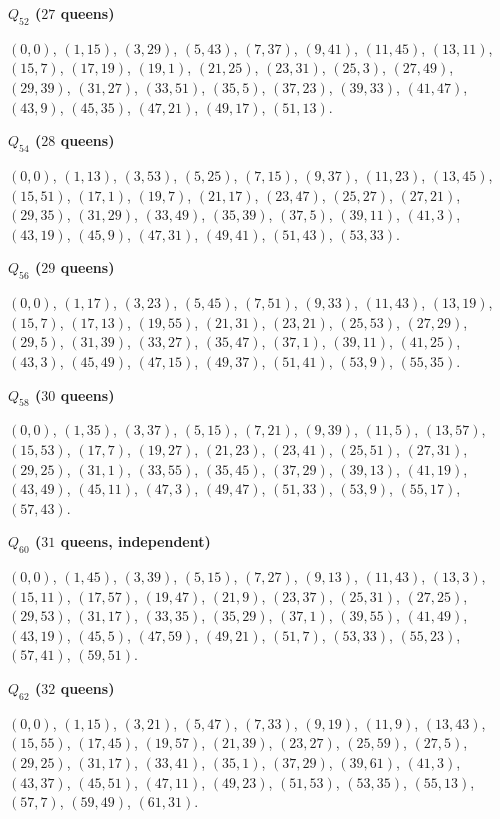 \documentclass[11pt,a4paper]{article}
\theoremstyle{result}
\theoremstyle{definition}
\theoremstyle{remark}
\newenvironment{placement}[1]{%
  \par\addvspace{7pt}\begin{samepage}%
  \noindent\textbf{#1}\par\nobreak\noindent\ignorespaces
}{\par\end{samepage}}
\begin{document}
\begin{placement}{$Q_{52}$ ($27$ queens)}
$(0,0)$, $(1,15)$, $(3,29)$, $(5,43)$, $(7,37)$, $(9,41)$, $(11,45)$, $(13,11)$, $(15,7)$, $(17,19)$, $(19,1)$, $(21,25)$, $(23,31)$, $(25,3)$, $(27,49)$, $(29,39)$, $(31,27)$, $(33,51)$, $(35,5)$, $(37,23)$, $(39,33)$, $(41,47)$, $(43,9)$, $(45,35)$, $(47,21)$, $(49,17)$, $(51,13)$.
\end{placement}

\begin{placement}{$Q_{54}$ ($28$ queens)}
$(0,0)$, $(1,13)$, $(3,53)$, $(5,25)$, $(7,15)$, $(9,37)$, $(11,23)$, $(13,45)$, $(15,51)$, $(17,1)$, $(19,7)$, $(21,17)$, $(23,47)$, $(25,27)$, $(27,21)$, $(29,35)$, $(31,29)$, $(33,49)$, $(35,39)$, $(37,5)$, $(39,11)$, $(41,3)$, $(43,19)$, $(45,9)$, $(47,31)$, $(49,41)$, $(51,43)$, $(53,33)$.
\end{placement}

\begin{placement}{$Q_{56}$ ($29$ queens)}
$(0,0)$, $(1,17)$, $(3,23)$, $(5,45)$, $(7,51)$, $(9,33)$, $(11,43)$, $(13,19)$, $(15,7)$, $(17,13)$, $(19,55)$, $(21,31)$, $(23,21)$, $(25,53)$, $(27,29)$, $(29,5)$, $(31,39)$, $(33,27)$, $(35,47)$, $(37,1)$, $(39,11)$, $(41,25)$, $(43,3)$, $(45,49)$, $(47,15)$, $(49,37)$, $(51,41)$, $(53,9)$, $(55,35)$.
\end{placement}

\begin{placement}{$Q_{58}$ ($30$ queens)}
$(0,0)$, $(1,35)$, $(3,37)$, $(5,15)$, $(7,21)$, $(9,39)$, $(11,5)$, $(13,57)$, $(15,53)$, $(17,7)$, $(19,27)$, $(21,23)$, $(23,41)$, $(25,51)$, $(27,31)$, $(29,25)$, $(31,1)$, $(33,55)$, $(35,45)$, $(37,29)$, $(39,13)$, $(41,19)$, $(43,49)$, $(45,11)$, $(47,3)$, $(49,47)$, $(51,33)$, $(53,9)$, $(55,17)$, $(57,43)$.
\end{placement}

\begin{placement}{$Q_{60}$ ($31$ queens, independent)}
$(0,0)$, $(1,45)$, $(3,39)$, $(5,15)$, $(7,27)$, $(9,13)$, $(11,43)$, $(13,3)$, $(15,11)$, $(17,57)$, $(19,47)$, $(21,9)$, $(23,37)$, $(25,31)$, $(27,25)$, $(29,53)$, $(31,17)$, $(33,35)$, $(35,29)$, $(37,1)$, $(39,55)$, $(41,49)$, $(43,19)$, $(45,5)$, $(47,59)$, $(49,21)$, $(51,7)$, $(53,33)$, $(55,23)$, $(57,41)$, $(59,51)$.
\end{placement}

\begin{placement}{$Q_{62}$ ($32$ queens)}
$(0,0)$, $(1,15)$, $(3,21)$, $(5,47)$, $(7,33)$, $(9,19)$, $(11,9)$, $(13,43)$, $(15,55)$, $(17,45)$, $(19,57)$, $(21,39)$, $(23,27)$, $(25,59)$, $(27,5)$, $(29,25)$, $(31,17)$, $(33,41)$, $(35,1)$, $(37,29)$, $(39,61)$, $(41,3)$, $(43,37)$, $(45,51)$, $(47,11)$, $(49,23)$, $(51,53)$, $(53,35)$, $(55,13)$, $(57,7)$, $(59,49)$, $(61,31)$.
\end{placement}
\end{document}
